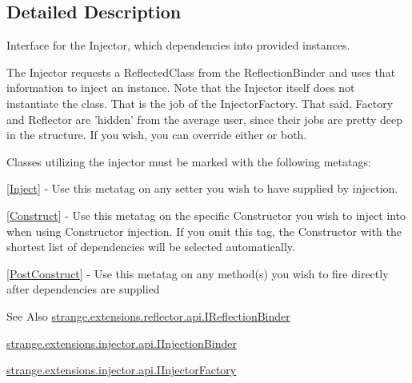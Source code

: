 \subsection{Detailed Description}
Interface for the Injector, which dependencies into provided instances. 

The Injector requests a Reflected\-Class from the Reflection\-Binder and uses that information to inject an instance. Note that the Injector itself does not instantiate the class. That is the job of the Injector\-Factory. That said, Factory and Reflector are 'hidden' from the average user, since their jobs are pretty deep in the structure. If you wish, you can override either or both.

Classes utilizing the injector must be marked with the following metatags\-: 
\begin{DoxyItemize}
\item \mbox{[}\hyperlink{class_inject}{Inject}\mbox{]} -\/ Use this metatag on any setter you wish to have supplied by injection. 
\item \mbox{[}\hyperlink{class_construct}{Construct}\mbox{]} -\/ Use this metatag on the specific Constructor you wish to inject into when using Constructor injection. If you omit this tag, the Constructor with the shortest list of dependencies will be selected automatically. 
\item \mbox{[}\hyperlink{class_post_construct}{Post\-Construct}\mbox{]} -\/ Use this metatag on any method(s) you wish to fire directly after dependencies are supplied 
\end{DoxyItemize}

\begin{DoxySeeAlso}{See Also}
\hyperlink{interfacestrange_1_1extensions_1_1reflector_1_1api_1_1_i_reflection_binder}{strange.\-extensions.\-reflector.\-api.\-I\-Reflection\-Binder} 

\hyperlink{interfacestrange_1_1extensions_1_1injector_1_1api_1_1_i_injection_binder}{strange.\-extensions.\-injector.\-api.\-I\-Injection\-Binder} 

\hyperlink{interfacestrange_1_1extensions_1_1injector_1_1api_1_1_i_injector_factory}{strange.\-extensions.\-injector.\-api.\-I\-Injector\-Factory} 
\end{DoxySeeAlso}


